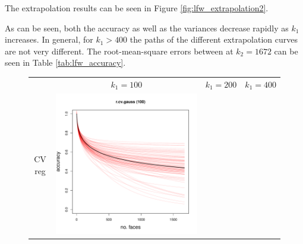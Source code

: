 \documentclass[twoside,11pt]{article}
\newenvironment{myfont}{\fontfamily{phv}\selectfont}{\par}
\begin{document}
The extrapolation results can be seen in Figure \ref{fig:lfw_extrapolation2}. 

 As
can be seen, both the accuracy as well as the variances decrease
rapidly as $k_1$ increases. In general, for $k_1>400$ the paths of the
different extrapolation curves are not very different. The
root-mean-square errors between at $k_2=1672$ can be seen in Table
\ref{tab:lfw_accuracy}.

\begin{figure}
\centering
\begin{tabular}{cccc}
&
\begin{myfont}$k_1 = 100$\end{myfont} & 
\begin{myfont}$k_1 = 200$\end{myfont} &
\begin{myfont}$k_1 = 400$\end{myfont}\\
CV reg & 
\includegraphics[scale = 0.2, clip = true, trim = 0 0 0 0.6in]{repeat_100_r_cv_gauss.pdf} &

\end{tabular}
\end{figure}
\end{document}
